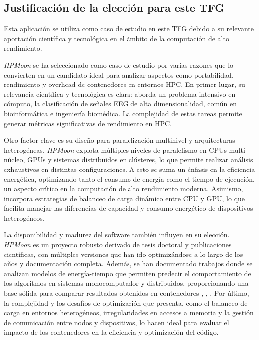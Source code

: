 \subsection{Justificación de la elección para este TFG}\label{subsec:hpm_justificacion}

Esta aplicación se utiliza como caso de estudio en este TFG debido a su relevante aportación científica y tecnológica en el ámbito de la computación de alto rendimiento.

\textit{HPMoon} se ha seleccionado como caso de estudio por varias razones que lo convierten en un candidato ideal para analizar aspectos como portabilidad, rendimiento y overhead de contenedores en entornos HPC. En primer lugar, su relevancia científica y tecnológica es clara: aborda un problema intensivo en cómputo, la clasificación de señales EEG de alta dimensionalidad, común en bioinformática e ingeniería biomédica. La complejidad de estas tareas permite generar métricas significativas de rendimiento en HPC.

Otro factor clave es su diseño para paralelización multinivel y arquitecturas heterogéneas. \textit{HPMoon} explota múltiples niveles de paralelismo en CPUs multi-núcleo, GPUs y sistemas distribuidos en clústeres, lo que permite realizar análisis exhaustivos en distintas configuraciones. A esto se suma un énfasis en la eficiencia energética, optimizando tanto el consumo de energía como el tiempo de ejecución, un aspecto crítico en la computación de alto rendimiento moderna. Asimismo, incorpora estrategias de balanceo de carga dinámico entre CPU y GPU, lo que facilita manejar las diferencias de capacidad y consumo energético de dispositivos heterogéneos.

La disponibilidad y madurez del software también influyen en su elección. \textit{HPMoon} es un proyecto robusto derivado de tesis doctoral y publicaciones científicas, con múltiples versiones que han ido optimizándose a lo largo de los años y documentación completa. Además, se han documentado trabajos donde se analizan modelos de energía-tiempo que permiten predecir el comportamiento de los algoritmos en sistemas monocomputador y distribuidos, proporcionando una base sólida para comparar resultados obtenidos en contenedores \cite{escobar2025energytime}, \cite{escobar2019energyaware}, \cite{escobar2019timeenergy}. Por último, la complejidad y los desafíos de optimización que presenta, como el balanceo de carga en entornos heterogéneos, irregularidades en accesos a memoria y la gestión de comunicación entre nodos y dispositivos, lo hacen ideal para evaluar el impacto de los contenedores en la eficiencia y optimización del código.

